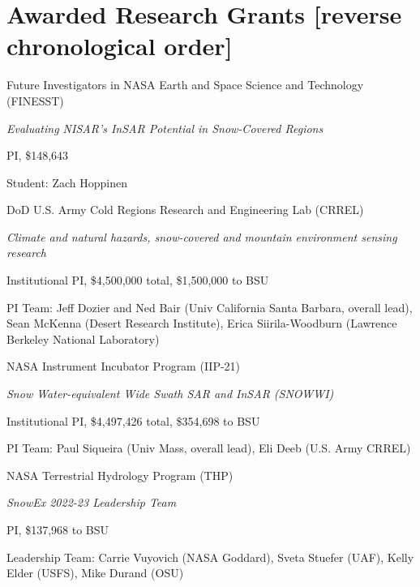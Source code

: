 \documentclass[11pt]{article}
\renewenvironment{itemize}{
  \begin{list}{}{
    \setlength{\leftmargin}{1.5em}
    \setlength{\itemsep}{0pt}
    \setlength{\parskip}{0pt}
  }
}{
  \end{list}
}
\begin{document}
\section*{Awarded Research Grants \small{[reverse chronological order]}}
\begin{itemize} 

\item[9/2023-8/2026] Future Investigators in NASA Earth and Space Science and Technology (FINESST)
\begin{itemize}
\item \textit{Evaluating NISAR’s InSAR Potential in Snow-Covered Regions}
\item PI, \$148,643 
\item Student: Zach Hoppinen
\end{itemize}

\item[9/2023-8/2025] DoD U.S. Army Cold Regions Research and Engineering Lab (CRREL)
\begin{itemize}
\item \textit{Climate and natural hazards, snow-covered and mountain environment sensing research}
\item Institutional PI, \$4,500,000 total, \$1,500,000 to BSU 
\item PI Team: Jeff Dozier and Ned Bair (Univ California Santa Barbara, overall lead), Sean McKenna (Desert Research Institute), Erica Siirila-Woodburn (Lawrence Berkeley National Laboratory)
\end{itemize}

\item[1/2022-2/2025] NASA Instrument Incubator Program (IIP-21)  
\begin{itemize}
\item \textit{Snow Water-equivalent Wide Swath SAR and InSAR (SNOWWI) }
\item Institutional PI, \$4,497,426  total, \$354,698 to BSU
\item PI Team: Paul Siqueira (Univ Mass, overall lead), Eli Deeb (U.S. Army CRREL)
\end{itemize}

\item[6/2022-9/2024] NASA Terrestrial Hydrology Program (THP) 
\begin{itemize}
\item \textit{SnowEx 2022-23 Leadership Team}
\item PI, \$137,968 to BSU
\item Leadership Team: Carrie Vuyovich (NASA Goddard), Sveta Stuefer (UAF), Kelly Elder (USFS), Mike Durand (OSU)
\end{itemize}


\end{itemize}
\end{document}
